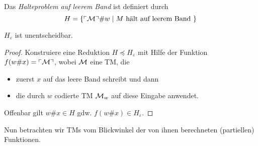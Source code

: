 \begin{Def}[name={[Halteproblem auf leerem Band $H_\varepsilon$]}]
	Das \emph{Halteproblem auf leerem Band} ist definiert durch
	\[H = \{\ulcorner \mathcal{M} \urcorner\# w \mid M \text{ hält auf leerem Band }\} \qedhere\]
\end{Def}
\begin{Satz}[name={[$H_\varepsilon$ ist unentscheidbar]}]
\label{satz:HalteproblemLeeresBand}
	$H_\varepsilon$ ist unentscheidbar.
\end{Satz}
\begin{proof}
  Konstruiere eine Reduktion $H \preceq H_\varepsilon$ mit Hilfe der
  Funktion $f(w\#x) = \ulcorner \mathcal{M} \urcorner$, wobei $\mathcal{M}$ eine \ac{TM}, die
  \begin{itemize}
  \item zuerst $x$ auf das leere Band schreibt und dann
  \item die durch $w$ codierte \ac{TM} $\mathcal{M}_w$ auf diese Eingabe anwendet.
  \end{itemize}
  Offenbar gilt $w\#x\in H$ gdw. $f(w\#x) \in H_\varepsilon$.
\end{proof}

Nun betrachten wir \ac{TM}s vom Blickwinkel der von ihnen berechneten
(partiellen) Funktionen. 

